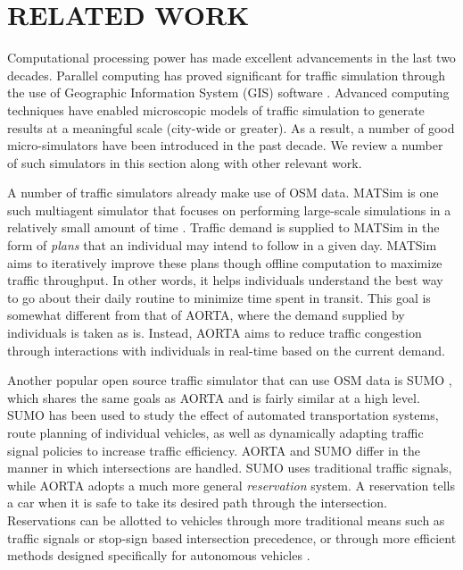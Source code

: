 \documentclass[letterpaper, 10 pt, conference]{ieeeconf}  %
\begin{document}



\section{RELATED WORK}
\label{sec:related_work}

Computational processing power has made excellent advancements in the
last two decades. Parallel computing has proved significant for
traffic simulation through the use of Geographic Information System
(GIS) software \cite{pursula1999simulation}. Advanced computing
techniques have enabled microscopic models of traffic simulation to
generate results at a meaningful scale (city-wide or greater). As a
result, a number of good micro-simulators have been introduced in the
past decade. We review a number of such simulators in this section
along with other relevant work.

A number of traffic simulators already make use of OSM data. MATSim is one such
multiagent simulator that focuses on performing large-scale simulations in a
relatively small amount of time \cite{balmer2009matsim}. Traffic demand is
supplied to MATSim in the form of \textit{plans} that an individual may intend
to follow in a given day. MATSim aims to iteratively improve these plans though
offline computation to maximize traffic throughput. In other words, it helps
individuals understand the best way to go about their daily routine to minimize
time spent in transit. This goal is somewhat different from that of AORTA,
where the demand supplied by individuals is taken as is. Instead, AORTA aims to
reduce traffic congestion through interactions with individuals in real-time
based on the current demand.

Another popular open source traffic simulator that can use OSM data is SUMO
\cite{SUMO2011}, which shares the same goals as AORTA and is fairly similar at
a high level. SUMO has been used to study the effect of automated
transportation systems, route planning of individual vehicles, as well as
dynamically adapting traffic signal policies to increase traffic efficiency.
AORTA and SUMO differ in the manner in which intersections are handled. SUMO
uses traditional traffic signals, while AORTA adopts a much more general
\textit{reservation} system. A reservation tells a car when it is safe to take
its desired path through the intersection. Reservations can be allotted to
vehicles through more traditional means such as traffic signals or stop-sign
based intersection precedence, or through more efficient methods designed
specifically for autonomous vehicles \cite{JAIR08-dresner}.
\end{document}
